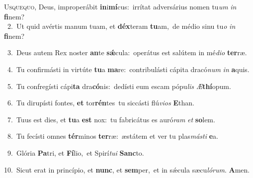\lettrine{\initial\textcolor{\initialcolor}{U}}{squequo,} Deus, improperábit \textbf{in}\-i\-\textbf{mí}\-cus:~\star irrítat adversárius nomen tu\textit{um} \textit{in} \textbf{fi}\-nem?\\
{\numbfont\textcolor{\numbcolor}{~2.}}~Ut quid avértis manum tuam, et \textbf{déx}\-teram \textbf{tu}\-am,~\star de médio sinu tu\textit{o} \textit{in} \textbf{fi}\-nem?\par
{\numbfont\textcolor{\numbcolor}{~3.}}~Deus autem Rex noster \textbf{an}\-te \textbf{sǽ}\-cula:~\star operátus est salútem in mé\-\textit{di}\-\textit{o} \textbf{ter}\-ræ.\par
{\numbfont\textcolor{\numbcolor}{~4.}}~Tu confirmásti in virtúte \textbf{tu}\-a \textbf{ma}\-re:~\star contribulásti cápita dracó\textit{num} \textit{in} \textbf{a}\-quis.\par
{\numbfont\textcolor{\numbcolor}{~5.}}~Tu confregísti cápi\textbf{ta} dra\-\textbf{có}\-nis:~\star dedísti eum escam pópu\textit{lis} \textit{Æ}\-\textbf{thí}opum.\par
{\numbfont\textcolor{\numbcolor}{~6.}}~Tu dirupísti fontes, \textbf{et} tor\-\textbf{rén}\-tes~\star tu siccásti flú\-\textit{vi}\-\textit{os} \textbf{E}\-than.\par
{\numbfont\textcolor{\numbcolor}{~7.}}~Tuus est dies, et \textbf{tu}\-a \textbf{est} nox:~\star tu fabricátus es auró\textit{ram} \textit{et} \textbf{so}\-lem.\par
{\numbfont\textcolor{\numbcolor}{~8.}}~Tu fecísti omnes \textbf{tér}\-minos \textbf{ter}\-ræ:~\star æstátem et ver tu plas\-\textit{más}\-\textit{ti} \textbf{e}\-a.\par
{\numbfont\textcolor{\numbcolor}{~9.}}~Glória \textbf{Pa}\-tri, et \textbf{Fí}\-lio,~\star et Spirí\-\textit{tu}\-\textit{i} \textbf{Sanc}\-to.\par
{\numbfont\textcolor{\numbcolor}{10.}}~Sicut erat in princípio, et \textbf{nunc}\-, et \textbf{sem}\-per,~\star et in sǽcula sæcu\-\textit{ló}\-\textit{rum}. \textbf{A}\-men.\par
